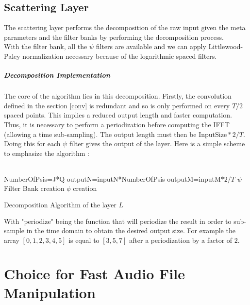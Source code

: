 \documentclass[a4paper]{report}
\begin{document}
\section{Scattering Layer}\label{ll}
The scattering layer performs the decomposition of the raw input given the meta parameters and the filter banks by performing the decomposition process. 
\\
With the filter bank, all the $\psi$ filters are available and we can apply Littlewood-Paley normalization necessary because of the logarithmic spaced filters.

\paragraph{Decomposition Implementation}
The core of the algorithm lies in this decomposition. Firstly, the convolution defined in the section \ref{conv} is redundant and so is only performed on every $T/2$ spaced points. This implies a reduced output length and faster computation. Thus, it is necessary to perform a periodization before computing the IFFT (allowing a time sub-sampling). The output length must then be $\text{InputSize}*2/T$. Doing this for each $\psi$ filter gives the output of the layer.
Here is a simple scheme to emphasize the algorithm :
\\
\\
\begin{algorithm}[H]
 NumberOfPsis=J*Q\;
 outputN=inputN*NumberOfPsis\;
 outputM=inputM$*2/T$\;
 $\psi$ Filter Bank creation\;
 $\phi$ creation\;
 \caption{Decomposition Algorithm of the layer $L$}
\end{algorithm}

With "periodize" being the function that will periodize the result in order to sub-sample in the time domain to obtain the desired output size. 
For example the array $[0,1,2,3,4,5]$ is equal to $[3,5,7]$ after a periodization by a factor of $2$.

\chapter{Choice for Fast Audio File Manipulation}
\end{document}
